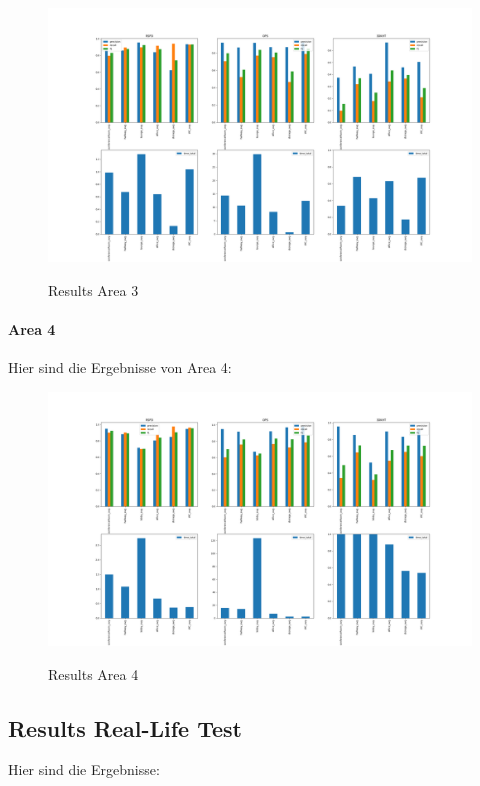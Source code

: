 \documentclass[main.tex]{subfiles}
\begin{document}
\begin{figure}[!ht]
	\centering
	\includegraphics[width=15 cm]{images/area_3_ohne_kht.png}
	\label{fig:area3}
    \caption{Results Area 3}
\end{figure}

\paragraph*{Area 4}
Hier sind die Ergebnisse von Area 4:

\begin{figure}
	\centering
	\includegraphics[width=15 cm]{images/area_4_ohne_kht.png}
	\label{fig:area4}
    \caption{Results Area 4}
\end{figure}

\subsection{Results Real-Life Test}

Hier sind die Ergebnisse:
\end{document}
